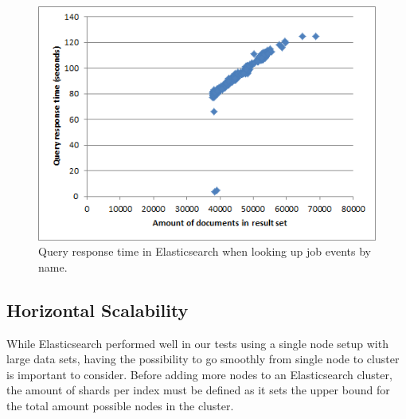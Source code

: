 \begin{figure}[h!]
\centering
\includegraphics[]{figure/query_by_name.png}
\caption{Query response time in Elasticsearch when looking up job events by name.}
\label{fig:query_by_name}
\end{figure}


%

\subsection{Horizontal Scalability}
While Elasticsearch performed well in our tests using a single node setup with large data sets, having the possibility to go smoothly from single node to cluster is important to consider. Before adding more nodes to an Elasticsearch cluster, the amount of shards per index must be defined as it sets the upper bound for the total amount possible nodes in the cluster.

